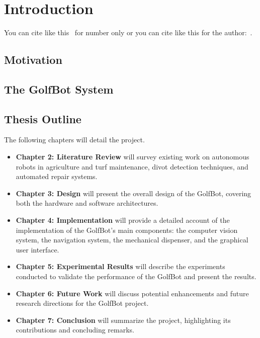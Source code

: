 \chapter{Introduction}
\label{chap:introduction}

You can cite like this~\citep{DiCarlo_2018_DynamicLocomotion} for number only or you can cite like this for the author:~\citet{DiCarlo_2018_DynamicLocomotion}.


\section{Motivation}

\section{The GolfBot System}

\section{Thesis Outline}
The following chapters will detail the project.
\begin{itemize}
    \item \textbf{Chapter 2: Literature Review} will survey existing work on autonomous robots in agriculture and turf maintenance, divot detection techniques, and automated repair systems.
    \item \textbf{Chapter 3: Design} will present the overall design of the GolfBot, covering both the hardware and software architectures.
    \item \textbf{Chapter 4: Implementation} will provide a detailed account of the implementation of the GolfBot's main components: the computer vision system, the navigation system, the mechanical dispenser, and the graphical user interface.
    \item \textbf{Chapter 5: Experimental Results} will describe the experiments conducted to validate the performance of the GolfBot and present the results.
    \item \textbf{Chapter 6: Future Work} will discuss potential enhancements and future research directions for the GolfBot project.
    \item \textbf{Chapter 7: Conclusion} will summarize the project, highlighting its contributions and concluding remarks.
\end{itemize}